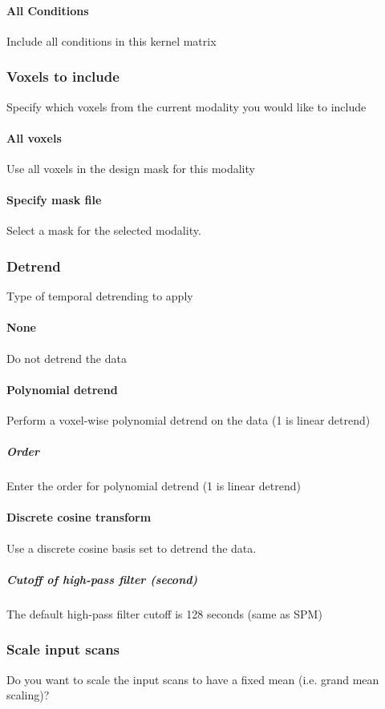 \paragraph{All Conditions}
Include all conditions in this kernel matrix


\subsubsection{Voxels to include}
Specify which voxels from the current modality you would like to include


\paragraph{All voxels}
Use all voxels in the design mask for this modality


\paragraph{Specify mask file}
Select a mask for the selected modality.


\subsubsection{Detrend}
Type of temporal detrending to apply


\paragraph{None}
Do not detrend the data 


\paragraph{Polynomial detrend }
Perform a voxel-wise polynomial detrend on the data (1 is linear detrend) 


\subparagraph{Order}
Enter the order for polynomial detrend (1 is linear detrend)


\paragraph{Discrete cosine transform}
Use a discrete cosine basis set to detrend the data.


\subparagraph{Cutoff of high-pass filter (second)}
The default high-pass filter cutoff is 128 seconds (same as SPM)


\subsubsection{Scale input scans}
Do you want to scale the input scans to have a fixed mean (i.e. grand mean scaling)?


